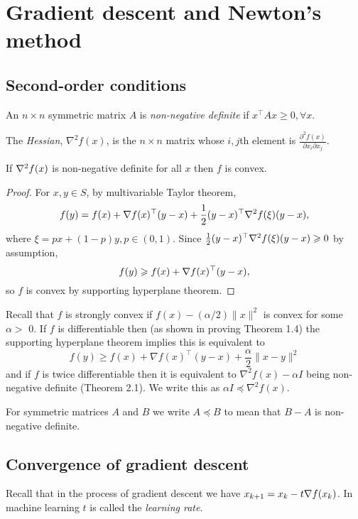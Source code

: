 \section{Gradient descent and Newton's method}
\subsection{Second-order conditions}
\begin{definition}
    An $n\times n$ symmetric matrix $A$ is \textit{non-negative definite} if $ x^\top A x\ge 0, \forall x $.

    The \textit{Hessian}, $ \nabla^2 f(x) $, is the $n\times n$ matrix whose $i,j$th element is $\displaystyle \frac{\partial^2 f(x)}{\partial x_i \partial x_j} $.
\end{definition}

\begin{theorem}
    If $ \nabla^2 f(x) $ is non-negative definite for all $x$ then $f$ is convex. 
\end{theorem}
\begin{proof}
    For $x,y\in S$, by multivariable Taylor theorem, 
    \[
        f(y) = f(x) + \nabla f(x) ^\top (y-x) + \frac{1}{2}(y-x)^\top \nabla^2f(\xi) (y-x), 
    \]
    where $ \xi = px + (1-p)y, p\in (0,1) $. Since $ \frac{1}{2}(y-x)^\top \nabla^2f(\xi)(y-x) \geqslant 0$ by assumption, 
    \[
        f(y) \geqslant f(x) + \nabla f(x)^\top (y-x),
    \]
    so $f$ is convex by supporting hyperplane theorem. 
\end{proof}

Recall that $f$ is strongly convex if $f(x)-(\alpha / 2)\|x\|^2$ is convex for some $\alpha>$ 0. If $f$ is differentiable then (as shown in proving Theorem 1.4) the supporting hyperplane theorem implies this is equivalent to
\[
f(y) \geq f(x)+\nabla f(x)^{\top}(y-x)+\frac{\alpha}{2}\|x-y\|^2
\]
and if $f$ is twice differentiable then it is equivalent to $\nabla^2 f(x)-\alpha I$ being non-negative definite (Theorem 2.1). We write this as $\alpha I \preceq \nabla^2 f(x)$.

\begin{definition}
    For symmetric matrices $A$ and $B$ we write $A \preceq B$ to mean that $B-A$ is non-negative definite.
\end{definition}

\subsection{Convergence of gradient descent}
Recall that in the process of gradient descent we have $ x_{k+1} = x_k - t \nabla f(x_k) $. In machine learning $t$ is called the \textit{learning rate}. 

